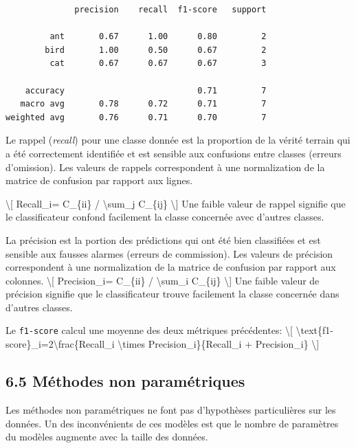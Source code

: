 \documentclass[
]{article}
\begin{document}
\begin{verbatim}
              precision    recall  f1-score   support

         ant       0.67      1.00      0.80         2
        bird       1.00      0.50      0.67         2
         cat       0.67      0.67      0.67         3

    accuracy                           0.71         7
   macro avg       0.78      0.72      0.71         7
weighted avg       0.76      0.71      0.70         7
\end{verbatim}

Le rappel (\emph{recall}) pour une classe donnée est la proportion de la
vérité terrain qui a été correctement identifiée et est sensible aux
confusions entre classes (erreurs d'omission). Les valeurs de rappels
correspondent à une normalization de la matrice de confusion par rapport
aux lignes.

{\textbackslash{[} Recall\_i= C\_\{ii\} / \textbackslash sum\_j
C\_\{ij\} \textbackslash{]}} Une faible valeur de rappel signifie que le
classificateur confond facilement la classe concernée avec d'autres
classes.

La précision est la portion des prédictions qui ont été bien classifiées
et est sensible aux fausses alarmes (erreurs de commission). Les valeurs
de précision correspondent à une normalization de la matrice de
confusion par rapport aux colonnes. {\textbackslash{[} Precision\_i=
C\_\{ii\} / \textbackslash sum\_i C\_\{ij\} \textbackslash{]}} Une
faible valeur de précision signifie que le classificateur trouve
facilement la classe concernée dans d'autres classes.

Le \texttt{f1-score} calcul une moyenne des deux métriques précédentes:
{\textbackslash{[}
\textbackslash text\{f1-score\}\_i=2\textbackslash frac\{Recall\_i
\textbackslash times Precision\_i\}\{Recall\_i + Precision\_i\}
\textbackslash{]}}

\subsection{\texorpdfstring{{6.5} Méthodes non
paramétriques}{6.5 Méthodes non paramétriques}}\label{muxe9thodes-non-paramuxe9triques}

Les méthodes non paramétriques ne font pas d'hypothèses particulières
sur les données. Un des inconvénients de ces modèles est que le nombre
de paramètres du modèles augmente avec la taille des données.

\label{sec-0511}
\end{document}
